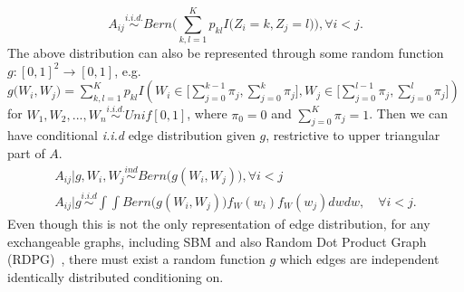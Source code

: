 \documentclass[12pt]{article}
\theoremstyle{definition}
\begin{document}
	\begin{equation} 
	A_{ij} \overset{i.i.d.}{\sim} Bern\big( \sum\limits_{k,l=1}^{K} p_{kl} I\big( Z_{i} = k, Z_{j} = l  \big)    \big), \forall  i < j.
	\end{equation}
The above distribution can also be represented through some random function $g : [0,1]^2 \rightarrow [0,1]$, e.g.$g\big( W_{i}, W_{j} \big) = \sum\limits_{k,l=1}^{K} p_{kl} I \left( W_{i} \in \big[ \sum\limits_{j=0}^{k-1} \pi_{j}, \sum\limits_{j=0}^{k} \pi_{j}   \big] , W_{j} \in \big[ \sum\limits_{j=0}^{l-1} \pi_{j}, \sum\limits_{j=0}^{l} \pi_{j}  \big]  \right)$ for  $W_{1}, W_{2}, ... , W_{n} \overset{i.i.d.}{\sim} Unif[0,1]$, where $\pi_{0} = 0$ and $\sum\limits_{j=0}^{K}  \pi_{j} = 1$. Then we can have conditional \textit{i.i.d} edge distribution given $g$, restrictive to upper triangular part of $A$.
\begin{equation} 
\begin{gathered}
A_{ij} \big| g, W_{i}, W_{j} \overset{ind}{\sim} Bern \big( g(W_{i}, W_{j})  \big), \forall i < j \\ 
A_{ij} \big| g \overset{i.i.d}{\sim} \int \int Bern \big( g(W_{i}, W_{j}) \big) f_{W}(w_{i}) f_{W}(w_{j}) dw dw, \quad \forall i < j.  
\end{gathered}
\end{equation}
Even though this is not the only representation of edge distribution, for any exchangeable graphs, including SBM and also Random Dot Product Graph (RDPG)~\citep{young2007random}, there must exist a random function $g$ which edges are independent identically distributed conditioning on. 
\end{document}
